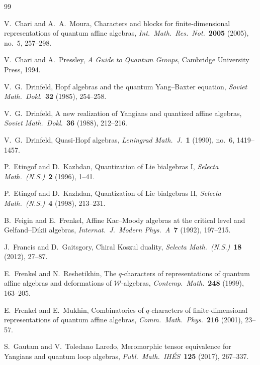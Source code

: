 \documentclass[11pt,reqno]{amsart}
\theoremstyle{definition}
\theoremstyle{remark}
\providecommand{\cW}{\mathcal{W}}
\numberwithin{equation}{section}
\begin{document}
\begin{thebibliography}{99}

V.~Chari and A.~A.~Moura,
Characters and blocks for finite-dimensional representations of
quantum affine algebras,
\textit{Int.\ Math.\ Res.\ Not.}\ \textbf{2005} (2005), no.~5,
257--298.

V.~Chari and A.~Pressley,
\textit{A Guide to Quantum Groups},
Cambridge University Press, 1994.

V.~G.~Drinfeld,
Hopf algebras and the quantum Yang--Baxter equation,
\textit{Soviet Math.\ Dokl.}\ \textbf{32} (1985), 254--258.

V.~G.~Drinfeld,
A new realization of Yangians and quantized affine algebras,
\textit{Soviet Math.\ Dokl.}\ \textbf{36} (1988), 212--216.

V.~G.~Drinfeld,
Quasi-Hopf algebras,
\textit{Leningrad Math.\ J.}\ \textbf{1} (1990), no.~6, 1419--1457.

P.~Etingof and D.~Kazhdan,
Quantization of Lie bialgebras I,
\textit{Selecta Math.\ (N.S.)}\ \textbf{2} (1996), 1--41.

P.~Etingof and D.~Kazhdan,
Quantization of Lie bialgebras II,
\textit{Selecta Math.\ (N.S.)}\ \textbf{4} (1998), 213--231.

B.~Feigin and E.~Frenkel,
Affine Kac--Moody algebras at the critical level and
Gelfand--Dikii algebras,
\textit{Internat.\ J.\ Modern Phys.\ A}\ \textbf{7} (1992),
197--215.

J.~Francis and D.~Gaitsgory,
Chiral Koszul duality,
\textit{Selecta Math.\ (N.S.)}\ \textbf{18} (2012), 27--87.

E.~Frenkel and N.~Reshetikhin,
The $q$-characters of representations of quantum affine
algebras and deformations of $\cW$-algebras,
\textit{Contemp.\ Math.}\ \textbf{248} (1999), 163--205.

E.~Frenkel and E.~Mukhin,
Combinatorics of $q$-characters of finite-dimensional
representations of quantum affine algebras,
\textit{Comm.\ Math.\ Phys.}\ \textbf{216} (2001), 23--57.

S.~Gautam and V.~Toledano Laredo,
Meromorphic tensor equivalence for Yangians and quantum loop
algebras,
\textit{Publ.\ Math.\ IH\'ES}\ \textbf{125} (2017), 267--337.


\end{thebibliography}
\end{document}
